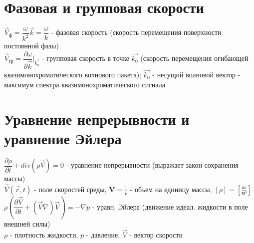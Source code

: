 \begin{multicols*}{2}
		\section{Фазовая и групповая скорости}
		$\vec{V}_\text{ф} = \dfrac{\omega}{k^2} \vec{k} = \dfrac{\omega}{k}$ - фазовая скорость (скорость перемещения поверхности постоянной фазы)\\
		$\vec{V}_\text{гр} = \dfrac{\partial\omega}{\partial \vec{k}}\bigg|_{\vec{k_0}}$ - групповая скорость в точке $\vec{k_0}$ (скорость перемещения огибающей квазимонохроматического волнового пакета); $\vec{k_0}$ - несущий волновой вектор - максимум спектра квазимонохроматического сигнала

		\section{Уравнение непрерывности и уравнение Эйлера}
		$\dfrac{\partial \rho}{\partial t} + div (\rho \vec{V}) = 0$ - уравнение непрерывности (выражает закон сохранения массы)\\
		$\vec{V} (\vec{r}, t)$ - поле скоростей среды, $\mathbf{V} = \frac{1}{\rho}$ - объем на единицу массы, $\left[\rho\right] = \left[\frac{\text{кг}}{\text{м}^3}\right]$\\
		$\rho \left(\dfrac{\partial \vec{V}}{\partial t} +  (\vec{V} \nabla)  \vec{V}\right)  = - \nabla p$ - уравн. Эйлера (движение идеал. жидкости в поле внешней силы)\\
		$\rho$ - плотность жидкости, $p$ - давление, $ \vec{V}$ - вектор скорости


\end{multicols*}

